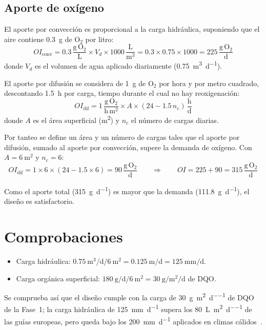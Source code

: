 \subsection{Aporte de oxígeno}

El aporte por convección es proporcional a la carga hidráulica, suponiendo que el aire contiene \qty{0.3}{\gram} de O$_2$ por litro:
\begin{equation*}
  OI_{\mathrm{conv}} = \num{0.3}\,\frac{\mathrm{g\,O_2}}{\mathrm{L}} \times V_d \times 1000\,\frac{\mathrm{L}}{\mathrm{m^3}} = \num{0.3} \times \num{0.75} \times 1000 = 225\,\frac{\mathrm{g\,O_2}}{\mathrm{d}}
\end{equation*}
donde $V_d$ es el volumen de agua aplicado diariamente (\qty{0.75}{\cubic\meter\per\day}).

El aporte por difusión se considera de \qty{1}{\gram} de O$_2$ por hora y por metro cuadrado, descontando \qty{1.5}{\hour} por carga, tiempo durante el cual no hay reoxigenación:
\begin{equation*}
  OI_{\mathrm{dif}} = 1\,\frac{\mathrm{g\,O_2}}{\mathrm{h\,m^2}} \times A \times \left(24 - \num{1.5}\, n_{c}\right)\,\frac{\mathrm{h}}{\mathrm{d}}
\end{equation*}
donde $A$ es el área superficial (\unit{\square\meter}) y $n_c$ el número de cargas diarias.

Por tanteo se define un área y un número de cargas tales que el aporte por difusión, sumado al aporte por convección, supere la demanda de oxígeno.
Con $A = \qty{6}{\square\meter}$ y $n_c = 6$:
\begin{equation*}
  OI_{\mathrm{dif}} = 1 \times 6 \times (24 - \num{1.5} \times 6) = 90\,\frac{\mathrm{g\,O_2}}{\mathrm{d}}
  \qquad\Rightarrow\qquad
  OI = 225 + 90 = 315\,\frac{\mathrm{g\,O_2}}{\mathrm{d}}
\end{equation*}

Como el aporte total (\qty{315}{\gram\per\day}) es mayor que la demanda (\qty{111.8}{\gram\per\day}), el diseño es satisfactorio.

\section{Comprobaciones}

\begin{itemize}
  \item Carga hidráulica: $\qty{0.75}{\cubic\meter\per\day} / \qty{6}{\square\meter} = \qty{0.125}{\meter\per\day} = \qty{125}{\milli\meter\per\day}$.
  \item Carga orgánica superficial: $\qty{180}{\gram\per\day} / \qty{6}{\square\meter} = \qty{30}{\gram\per\square\meter\per\day}$ de DQO.
\end{itemize}

Se comprueba así que el diseño cumple con la carga de \qty{30}{\gram\per\square\meter\per\day} de DQO de la Fase~1; la carga hidráulica de \qty{125}{\milli\meter\per\day} supera los \qty{80}{\liter\per\square\meter\per\day} de las guías europeas, pero queda bajo los \qty{200}{\milli\meter\per\day} aplicados en climas cálidos~\parencite{brix2005use,dotro2021humedales}.
